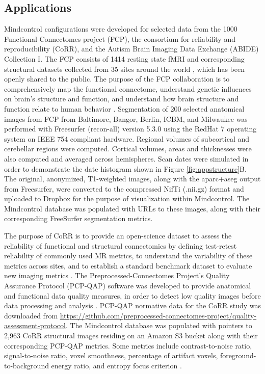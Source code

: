 \subsection{Applications}

Mindcontrol configurations were developed for selected data from the 1000 Functional Connectomes project (FCP), the consortium for reliability and reproducibility (CoRR), and the Autism Brain Imaging Data Exchange (ABIDE) Collection I. The FCP consists of 1414 resting state fMRI and corresponding structural datasets collected from 35 sites around the world  \cite{biswal2010toward}, which has been openly shared to the public. The purpose of the FCP collaboration is to comprehensively map the functional connectome, understand genetic influences on brain's structure and function, and understand how brain structure and function relate to human behavior \cite{biswal2010toward}. Segmentation of 200 selected anatomical images from FCP from Baltimore, Bangor, Berlin, ICBM, and Milwaukee was performed with Freesurfer (recon-all) version 5.3.0 \cite{fischl2002whole} using the RedHat 7 operating system on IEEE 754 compliant hardware. Regional volumes of  subcortical and cerebellar regions were computed. Cortical volumes, areas and thicknesses were also computed and averaged across hemispheres. Scan dates were simulated in order to demonstrate the date histogram shown in Figure \ref{fig:appstructure}B. The original, anonymized, T1-weighted images, along with the aparc+aseg output from Freesurfer, were converted to the compressed NifTi (.nii.gz) format and uploaded to Dropbox for the purpose of visualization within Mindcontrol. The Mindcontrol database was populated with URLs to these images, along with their corresponding FreeSurfer segmentation metrics.

The purpose of CoRR is to provide an open-science dataset to assess the reliability of functional and structural connectomics by defining test-retest reliability of commonly used MR metrics, to understand the variability of these metrics across sites, and to establish a standard benchmark dataset to evaluate new imaging metrics \cite{Zuo_2014}. The Preprocessed-Connectomes Project's Quality Assurance Protocol (PCP-QAP) software was developed to provide anatomical and functional data quality measures, in order to detect low quality images before data processing and analysis \cite{shehzadpreprocessed}. PCP-QAP normative data for the CoRR study was downloaded from \href{http://raw.githubusercontent.com/preprocessed-connectomes-project/quality-assessment-protocol/master/poster_data/corr_anat.csv}{https://github.com/preprocessed-connectomes-project/quality-assessment-protocol}. The Mindcontrol database was populated with pointers to 2,963 CoRR structural images residing on an Amazon S3 bucket along with their corresponding PCP-QAP metrics. Some metrics include contrast-to-noise ratio, signal-to-noise ratio, voxel smoothness, percentage of artifact voxels, foreground-to-background energy ratio, and entropy focus criterion \cite{shehzadpreprocessed}. 

